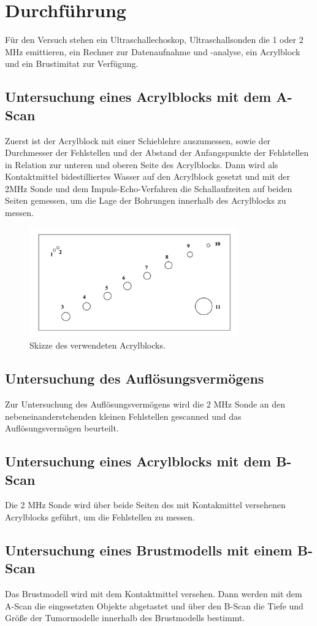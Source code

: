 \section{Durchführung}
\label{sec:Durchführung}
Für den Versuch stehen ein Ultraschallechoskop, Ultraschallsonden die 1 oder 2 MHz emittieren, ein Rechner zur Datenaufnahme und -analyse, ein Acrylblock und ein Brustimitat zur Verfügung.

\subsection{Untersuchung eines Acrylblocks mit dem A-Scan}
Zuerst ist der Acrylblock mit einer Schieblehre auszumessen, sowie der Durchmesser der Fehlstellen und der Abstand der Anfangspunkte der Fehlstellen in Relation zur unteren und oberen Seite des Acrylblocks.
Dann wird als Kontaktmittel bidestilliertes Wasser auf den Acrylblock gesetzt und mit der 2MHz Sonde und dem Impuls-Echo-Verfahren die Schallaufzeiten auf beiden Seiten gemessen, um die Lage der Bohrungen innerhalb des Acrylblocks zu messen.  
\begin{figure}[H]
  \centering
  \includegraphics[width=9cm]{content/block}
  \caption{Skizze des verwendeten Acrylblocks. \cite{1}}
\end{figure}

\subsection{Untersuchung des Auflösungsvermögens}
Zur Untersuchung des Auflösungsvermögens wird die 2 MHz Sonde an den nebeneinanderstehenden kleinen Fehlstellen gescanned und das Auflösungsvermögen beurteilt.

\subsection{Untersuchung eines Acrylblocks mit dem B-Scan}
Die 2 MHz Sonde wird über beide Seiten des mit Kontakmittel versehenen Acrylblocks geführt, um die Fehlstellen zu messen. 

\subsection{Untersuchung eines Brustmodells mit einem B-Scan}
Das Brustmodell wird mit dem Kontaktmittel versehen. Dann werden mit dem A-Scan die eingesetzten Objekte abgetastet und über den B-Scan die Tiefe und Größe der Tumormodelle innerhalb des Brustmodells bestimmt.
